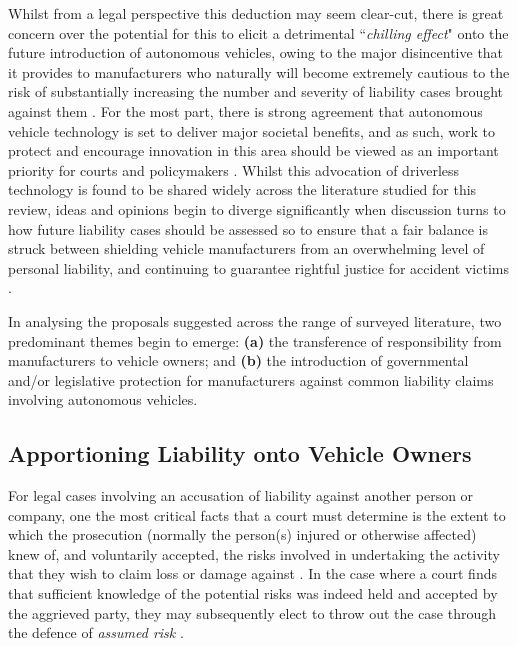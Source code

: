 \documentclass[conference]{IEEEtran}
\begin{document}
Whilst from a legal perspective this deduction may seem clear-cut, there is great concern over the potential for this to elicit a detrimental ``\textit{chilling effect}" \cite{schellekens} onto the future introduction of autonomous vehicles, owing to the major disincentive that it provides to manufacturers who  naturally will become extremely cautious to the risk of substantially increasing the number and severity of liability cases brought against them \cite{marchant}. For the most part, there is strong agreement that autonomous vehicle technology is set to deliver major societal benefits, and as such,  work to protect and encourage innovation in this area should be viewed as an important priority for courts and policymakers \cite{marchant}. Whilst this advocation of driverless technology is found to be shared widely across the  literature studied for this review, ideas and opinions begin to diverge significantly when discussion turns to how future liability cases should be assessed so to ensure that a fair balance is struck between shielding vehicle manufacturers from an overwhelming level of personal liability, and continuing to guarantee rightful justice for accident victims \cite{schellekens}.

In analysing the proposals suggested across the range of surveyed literature, two predominant themes begin to emerge: \textbf{(a)} the transference of responsibility from manufacturers to vehicle owners; and \textbf{(b)} the introduction of governmental and/or legislative protection for manufacturers against common liability claims involving autonomous vehicles.

\subsection{Apportioning Liability onto Vehicle Owners}

For legal cases involving an accusation of liability against another person or company, one the most critical facts that a court must determine is the extent to which the prosecution (normally the person(s) injured or otherwise affected) knew of, and voluntarily accepted, the risks involved in undertaking the activity that they wish to claim loss or damage against \cite{tort-law}. In the case where a court finds that sufficient knowledge of the potential risks was indeed held and accepted by the aggrieved party, they may subsequently elect to throw out the case through the defence of \textit{assumed risk} \cite{marchant}.
\end{document}
